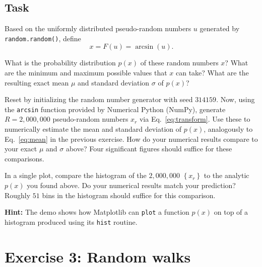 \documentclass[12 pt]{article} %
\newcommand{\si}{\ensuremath{\sigma} }
\newcommand{\eq}[1]{Eq.~\ref{#1}}
\newcommand{\showmarks}[1]{\rightline{\texttt{[#1 marks]}}} %
\begin{document}
\newpage
\subsection*{Task}
Based on the uniformly distributed pseudo-random numbers $u$ generated by \texttt{random.random()}, define
\begin{equation}
  \label{eq:transform}
  x = F(u) = \arcsin\left(u\right).
\end{equation}

What is the probability distribution $p(x)$ of these random numbers $x$?
What are the minimum and maximum possible values that $x$ can take?
What are the resulting exact mean $\mu$ and standard deviation \si of $p(x)$?

\showmarks{5}

Reset by initializing the random number generator with seed $314159$. %
Now, using the \texttt{arcsin} function provided by Numerical Python (NumPy), generate $R = 2{,}000{,}000$ pseudo-random numbers $x_r$ via \eq{eq:transform}.
Use these to numerically estimate the mean and standard deviation of $p(x)$, analogously to \eq{eq:mean} in the previous exercise.
How do your numerical results compare to your exact $\mu$ and \si above?
Four significant figures should suffice for these comparisons.

\showmarks{5}

In a single plot, compare the histogram of the $2{,}000{,}000$ $\left\{x_r\right\}$ to the analytic $p(x)$ you found above.
Do your numerical results match your prediction?
Roughly $51$ bins in the histogram should suffice for this comparison.

\textbf{Hint:} The demo shows how Matplotlib can \texttt{plot} a function $p(x)$ on top of a histogram produced using its \texttt{hist} routine.

\showmarks{5}



\newpage %
\section*{Exercise 3: Random walks}
\end{document}
